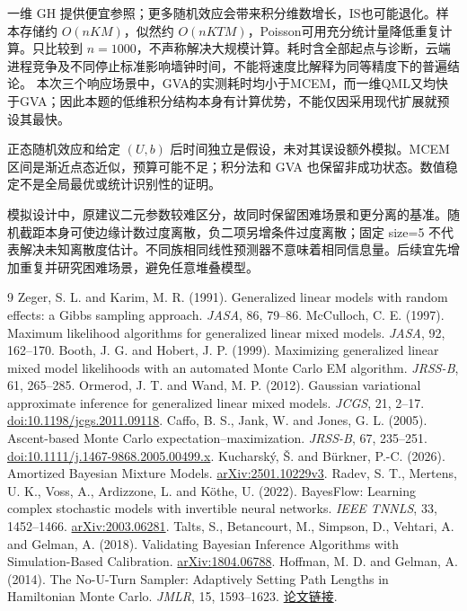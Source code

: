 \documentclass[UTF8,a4paper,11pt,fontset=fandol]{ctexart}
\begin{document}
一维 GH 提供便宜参照；更多随机效应会带来积分维数增长，IS也可能退化。样本存储约 $O(nKM)$，似然约 $O(nKTM)$，Poisson可用充分统计量降低重复计算。只比较到 $n=1000$，不声称解决大规模计算。耗时含全部起点与诊断，云端进程竞争及不同停止标准影响墙钟时间，不能将速度比解释为同等精度下的普遍结论。
本次三个响应场景中，GVA的实测耗时均小于MCEM，而一维QML又均快于GVA；因此本题的低维积分结构本身有计算优势，不能仅因采用现代扩展就预设其最快。

正态随机效应和给定 $(U,b)$ 后时间独立是假设，未对其误设额外模拟。MCEM区间是渐近点态近似，预算可能不足；积分法和 GVA 也保留非成功状态。数值稳定不是全局最优或统计识别性的证明。

模拟设计中，原建议二元参数较难区分，故同时保留困难场景和更分离的基准。随机截距本身可使边缘计数过度离散，负二项另增条件过度离散；固定 size=5 不代表解决未知离散度估计。不同族相同线性预测器不意味着相同信息量。后续宜先增加重复并研究困难场景，避免任意堆叠模型。

\clearpage
{\raggedright\begin{thebibliography}{9}
 Zeger, S. L. and Karim, M. R. (1991). Generalized linear models with random effects: a Gibbs sampling approach. \emph{JASA}, 86, 79--86.
 McCulloch, C. E. (1997). Maximum likelihood algorithms for generalized linear mixed models. \emph{JASA}, 92, 162--170.
 Booth, J. G. and Hobert, J. P. (1999). Maximizing generalized linear mixed model likelihoods with an automated Monte Carlo EM algorithm. \emph{JRSS-B}, 61, 265--285.
 Ormerod, J. T. and Wand, M. P. (2012). Gaussian variational approximate inference for generalized linear mixed models. \emph{JCGS}, 21, 2--17. \href{https://doi.org/10.1198/jcgs.2011.09118}{doi:10.1198/jcgs.2011.09118}.
 Caffo, B. S., Jank, W. and Jones, G. L. (2005). Ascent-based Monte Carlo expectation--maximization. \emph{JRSS-B}, 67, 235--251. \href{https://doi.org/10.1111/j.1467-9868.2005.00499.x}{doi:10.1111/j.1467-9868.2005.00499.x}.
 Kucharský, Š. and Bürkner, P.-C. (2026). Amortized Bayesian Mixture Models. \href{https://arxiv.org/abs/2501.10229v3}{arXiv:2501.10229v3}.
 Radev, S. T., Mertens, U. K., Voss, A., Ardizzone, L. and Köthe, U. (2022). BayesFlow: Learning complex stochastic models with invertible neural networks. \emph{IEEE TNNLS}, 33, 1452--1466. \href{https://arxiv.org/abs/2003.06281}{arXiv:2003.06281}.
 Talts, S., Betancourt, M., Simpson, D., Vehtari, A. and Gelman, A. (2018). Validating Bayesian Inference Algorithms with Simulation-Based Calibration. \href{https://arxiv.org/abs/1804.06788}{arXiv:1804.06788}.
 Hoffman, M. D. and Gelman, A. (2014). The No-U-Turn Sampler: Adaptively Setting Path Lengths in Hamiltonian Monte Carlo. \emph{JMLR}, 15, 1593--1623. \href{https://jmlr.org/papers/v15/hoffman14a.html}{论文链接}.
\end{thebibliography}}
\end{document}
